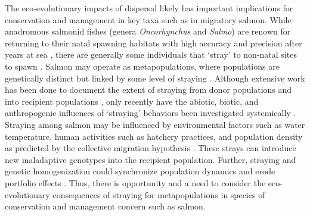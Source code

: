 \documentclass{revtex4}
\begin{document}
The eco-evolutionary impacts of dispersal likely has important implications for conservation and management in key taxa such as in migratory salmon.
While anadromous salmonid fishes (genera \emph{Oncorhynchus} and \emph{Salmo}) are renown for returning to their natal spawning habitats with high accuracy and precision after years at sea \citep{Quinn:2011tf,Jonsson:2011kg,Keefer:2014gg}, there are generally some individuals that `stray' to non-natal sites to spawn \citep{Quinn:1993ge,Hendry:2004wf}.
Salmon may operate as metapopulations, where populations are genetically distinct but linked by some level of straying \citep{Schtickzelle:2007wb,Anderson:2014cx}.
Although extensive work has been done to document the extent of straying from donor populations and into recipient populations \citep{Keefer:2014gg,Bett:2017ha}, only recently have the abiotic, biotic, and anthropogenic influences of `straying' behaviors been investigated systemically \citep{Keefer:2008bs,Westley:2015to,Bond:2016dz}.
Straying among salmon may be influenced by environmental factors such as water temperature, human activities such as hatchery practices, and population density as predicted by the collective migration hypothesis \citep{Peterson:2014gy}.
These strays can introduce new maladaptive genotypes into the recipient population.
Further, straying and genetic homogenization could synchronize population dynamics and erode portfolio effects \citep{Moore:2010gs,Carlson:2011ce,Braun:2016ib}.
Thus, there is opportunity and a need to consider the eco-evolutionary consequences of straying for metapopulations in species of conservation and management concern such as salmon. 

\end{document}
